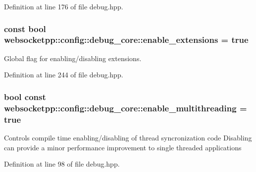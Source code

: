 Definition at line 176 of file debug.\+hpp.

\hypertarget{structwebsocketpp_1_1config_1_1debug__core_a483b9b5f8929dddf7389f6a751400406}{}
\subsubsection[{enable\+\_\+extensions}]{\setlength{\rightskip}{0pt plus 5cm}const bool websocketpp\+::config\+::debug\+\_\+core\+::enable\+\_\+extensions = true\hspace{0.3cm}{\ttfamily [static]}}\label{structwebsocketpp_1_1config_1_1debug__core_a483b9b5f8929dddf7389f6a751400406}


Global flag for enabling/disabling extensions. 



Definition at line 244 of file debug.\+hpp.

\hypertarget{structwebsocketpp_1_1config_1_1debug__core_acbf3aa1de5fc4dacbdb7866375791409}{}
\subsubsection[{enable\+\_\+multithreading}]{\setlength{\rightskip}{0pt plus 5cm}bool const websocketpp\+::config\+::debug\+\_\+core\+::enable\+\_\+multithreading = true\hspace{0.3cm}{\ttfamily [static]}}\label{structwebsocketpp_1_1config_1_1debug__core_acbf3aa1de5fc4dacbdb7866375791409}
Controls compile time enabling/disabling of thread syncronization code Disabling can provide a minor performance improvement to single threaded applications 

Definition at line 98 of file debug.\+hpp.

\hypertarget{structwebsocketpp_1_1config_1_1debug__core_a95ea7d50bc0617bc447d98dca1ea7e0d}{}
